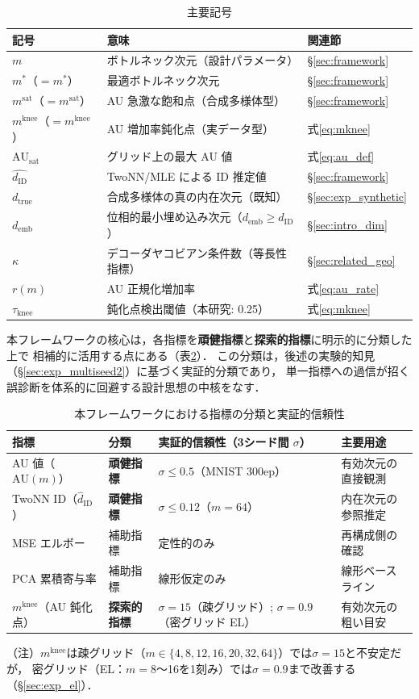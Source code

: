 \documentclass[11pt,a4paper]{jsarticle}
\newcommand{\dID}{d_{\mathrm{ID}}}
\newcommand{\dzopt}{m^*}
\newcommand{\dtrue}{d_{\mathrm{true}}}
\newcommand{\kap}{\kappa}
\newcommand{\AUsat}{\mathrm{AU}_{\mathrm{sat}}}
\newcommand{\dzsat}{m^{\mathrm{sat}}}
\newcommand{\mknee}{m^{\mathrm{knee}}}
\newcommand{\demb}{d_{\mathrm{emb}}}
\begin{document}
\begin{table}[H]
\centering
\caption{主要記号}
\label{tab:notation}
\small
\begin{tabular}{lll}
\toprule
記号 & 意味 & 関連節 \\
\midrule
$m$ & ボトルネック次元（設計パラメータ） & §\ref{sec:framework} \\
$\dzopt$（$= m^*$） & 最適ボトルネック次元 & §\ref{sec:framework} \\
$\dzsat$（$= m^{\mathrm{sat}}$） & AU 急激な飽和点（合成多様体型） & §\ref{sec:framework} \\
$\mknee$（$= m^{\mathrm{knee}}$） & AU 増加率鈍化点（実データ型） & 式\eqref{eq:mknee} \\
$\AUsat$ & グリッド上の最大 AU 値 & 式\eqref{eq:au_def} \\
$\hat{\dID}$ & TwoNN/MLE による ID 推定値 & §\ref{sec:framework} \\
$\dtrue$ & 合成多様体の真の内在次元（既知） & §\ref{sec:exp_synthetic} \\
$\demb$ & 位相的最小埋め込み次元（$\demb \geq \dID$） & §\ref{sec:intro_dim} \\
$\kap$ & デコーダヤコビアン条件数（等長性指標） & §\ref{sec:related_geo} \\
$r(m)$ & AU 正規化増加率 & 式\eqref{eq:au_rate} \\
$\tau_{\mathrm{knee}}$ & 鈍化点検出閾値（本研究: 0.25） & 式\eqref{eq:mknee} \\
\bottomrule
\end{tabular}
\end{table}

本フレームワークの核心は，各指標を\textbf{頑健指標}と\textbf{探索的指標}に明示的に分類した上で
相補的に活用する点にある（表\ref{tab:indicator_class}）．
この分類は，後述の実験的知見（§\ref{sec:exp_multiseed2}）に基づく実証的分類であり，
単一指標への過信が招く誤診断を体系的に回避する設計思想の中核をなす．

\begin{table}[H]
\centering
\caption{本フレームワークにおける指標の分類と実証的信頼性}
\label{tab:indicator_class}
\small
\begin{tabular}{llll}
\toprule
指標 & 分類 & 実証的信頼性（3シード間 $\sigma$） & 主要用途 \\
\midrule
AU 値（$\mathrm{AU}(m)$） & \textbf{頑健指標} & $\sigma \leq 0.5$（MNIST 300ep） & 有効次元の直接観測 \\
TwoNN ID（$\hat{d}_\mathrm{ID}$） & \textbf{頑健指標} & $\sigma \leq 0.12$（$m=64$） & 内在次元の参照推定 \\
MSE エルボー & 補助指標 & 定性的のみ & 再構成側の確認 \\
PCA 累積寄与率 & 補助指標 & 線形仮定のみ & 線形ベースライン \\
$\mknee$（AU 鈍化点） & \textbf{探索的指標} & $\sigma = 15$（疎グリッド）; $\sigma = 0.9$（密グリッド EL） & 有効次元の粗い目安 \\
\bottomrule
\end{tabular}
\medskip
\footnotesize
（注）$\mknee$は疎グリッド（$m \in \{4,8,12,16,20,32,64\}$）では$\sigma=15$と不安定だが，
密グリッド（EL：$m=8$〜16を1刻み）では$\sigma=0.9$まで改善する（§\ref{sec:exp_el}）．
\normalsize
\end{table}
\end{document}
